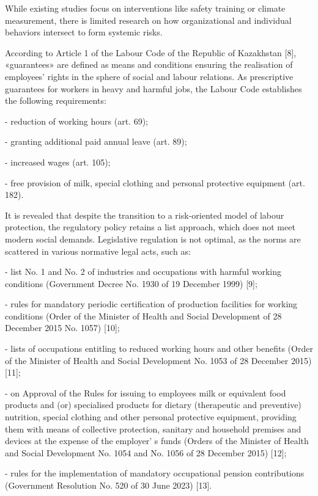 While existing studies focus on interventions like safety training or
climate measurement, there is limited research on how organizational and
individual behaviors intersect to form systemic risks.

According to Article 1 of the Labour Code of the Republic of Kazakhstan
{[}8{]}, «guarantees» are defined as means and conditions ensuring the
realisation of employees'{} rights in the sphere of
social and labour relations. As prescriptive guarantees for workers in
heavy and harmful jobs, the Labour Code establishes the following
requirements:

- reduction of working hours (art. 69);

- granting additional paid annual leave (art. 89);

- increased wages (art. 105);

- free provision of milk, special clothing and personal protective
equipment (art. 182).

It is revealed that despite the transition to a risk-oriented model of
labour protection, the regulatory policy retains a list approach, which
does not meet modern social demands. Legislative regulation is not
optimal, as the norms are scattered in various normative legal acts,
such as:

- list No. 1 and No. 2 of industries and occupations with harmful
working conditions (Government Decree No. 1930 of 19 December 1999)
{[}9{]};

- rules for mandatory periodic certification of production facilities
for working conditions (Order of the Minister of Health and Social
Development of 28 December 2015 No. 1057) {[}10{]};

- lists of occupations entitling to reduced working hours and other
benefits (Order of the Minister of Health and Social Development No.
1053 of 28 December 2015) {[}11{]};

- on Approval of the Rules for issuing to employees milk or equivalent
food products and (or) specialised products for dietary (therapeutic and
preventive) nutrition, special clothing and other personal protective
equipment, providing them with means of collective protection, sanitary
and household premises and devices at the expense of the
employer' s funds (Orders of the Minister of Health and
Social Development No. 1054 and No. 1056 of 28 December 2015) {[}12{]};

- rules for the implementation of mandatory occupational pension
contributions (Government Resolution No. 520 of 30 June 2023) {[}13{]}.

